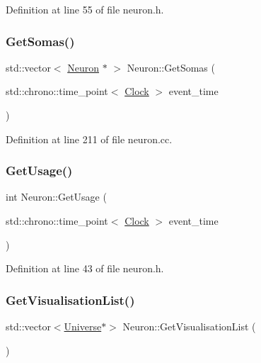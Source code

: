 Definition at line 55 of file neuron.\+h.

\mbox{\label{class_neuron_a867fbd498b54c115a2c8769f83c48020}} 
\subsubsection{\texorpdfstring{Get\+Somas()}{GetSomas()}}
{\footnotesize\ttfamily std\+::vector$<$ \mbox{\hyperlink{class_neuron}{Neuron}} $\ast$ $>$ Neuron\+::\+Get\+Somas (\begin{DoxyParamCaption}\item[{std\+::chrono\+::time\+\_\+point$<$ \mbox{\hyperlink{universe_8h_a0ef8d951d1ca5ab3cfaf7ab4c7a6fd80}{Clock}} $>$}]{event\+\_\+time }\end{DoxyParamCaption})}



Definition at line 211 of file neuron.\+cc.

\mbox{\label{class_neuron_a745b090da1b8f8fc7e3cf0ca06dfb117}} 
\subsubsection{\texorpdfstring{Get\+Usage()}{GetUsage()}}
{\footnotesize\ttfamily int Neuron\+::\+Get\+Usage (\begin{DoxyParamCaption}\item[{std\+::chrono\+::time\+\_\+point$<$ \mbox{\hyperlink{universe_8h_a0ef8d951d1ca5ab3cfaf7ab4c7a6fd80}{Clock}} $>$}]{event\+\_\+time }\end{DoxyParamCaption})\hspace{0.3cm}{\ttfamily [inline]}}



Definition at line 43 of file neuron.\+h.

\mbox{\label{class_neuron_a9af31418d1232135bf5074f6a3d5dbf1}} 
\subsubsection{\texorpdfstring{Get\+Visualisation\+List()}{GetVisualisationList()}}
{\footnotesize\ttfamily std\+::vector$<$\mbox{\hyperlink{class_universe}{Universe}}$\ast$$>$ Neuron\+::\+Get\+Visualisation\+List (\begin{DoxyParamCaption}{ }\end{DoxyParamCaption})\hspace{0.3cm}{\ttfamily [inline]}}



